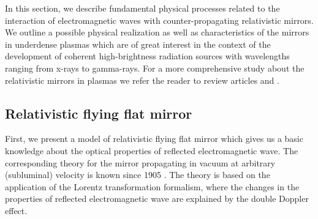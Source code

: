 \documentclass[10pt, a4paper, twoside, openright]{report}
\begin{document}
%

%

%

%

In this section, we describe fundamental physical processes related to the interaction of electromagnetic waves with counter-propagating relativistic mirrors. We outline a possible physical realization as well as characteristics of the mirrors in underdense plasmas which are of great interest in the context of the development of coherent high-brightness radiation sources with wavelengths ranging from x-rays to gamma-rays. For a more comprehensive study about the relativistic mirrors in plasmas we refer the reader to review articles  and .


\subsection{Relativistic flying flat mirror\label{sec:rffm}}


First, we present a model of relativistic flying flat mirror which gives us a basic knowledge about the optical properties of reflected electromagnetic wave. The corresponding theory for the mirror propagating in vacuum at arbitrary (subluminal) velocity is known since 1905 \cite{Einstein1905}. The theory is based on the application of the Lorentz transformation formalism, where the changes in the properties of reflected electromagnetic wave are explained by the double Doppler effect.
\end{document}
